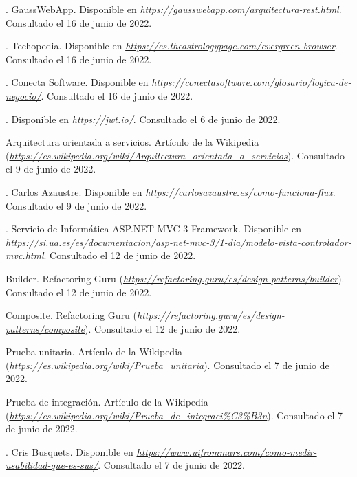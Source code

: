 \begin{thebibliography}{99}
. GaussWebApp. Disponible en {\it \url{https://gausswebapp.com/arquitectura-rest.html}}. Consultado el 16 de junio de 2022.

. Techopedia. Disponible en {\it \url{https://es.theastrologypage.com/evergreen-browser}}. Consultado el 16 de junio de 2022.

. Conecta Software. Disponible en {\it \url{https://conectasoftware.com/glosario/logica-de-negocio/}}. Consultado el 16 de junio de 2022.

. Disponible en {\it \url{https://jwt.io/}}. Consultado el 6 de junio de 2022.

 Arquitectura orientada a servicios. Artículo de la Wikipedia ({\it \url{https://es.wikipedia.org/wiki/Arquitectura_orientada_a_servicios}}). Consultado el 9 de junio de 2022.

. Carlos Azaustre. Disponible en {\it \url{https://carlosazaustre.es/como-funciona-flux}}. Consultado el 9 de junio de 2022.

. Servicio de Informática ASP.NET MVC 3 Framework. Disponible en {\it \url{https://si.ua.es/es/documentacion/asp-net-mvc-3/1-dia/modelo-vista-controlador-mvc.html}}. Consultado el 12 de junio de 2022.

 Builder. Refactoring Guru ({\it \url{https://refactoring.guru/es/design-patterns/builder}}). Consultado el 12 de junio de 2022.

 Composite. Refactoring Guru ({\it \url{https://refactoring.guru/es/design-patterns/composite}}). Consultado el 12 de junio de 2022.

 Prueba unitaria. Artículo de la Wikipedia ({\it \url{https://es.wikipedia.org/wiki/Prueba_unitaria}}). Consultado el 7 de junio de 2022.

 Prueba de integración. Artículo de la Wikipedia ({\it \url{https://es.wikipedia.org/wiki/Prueba_de_integraci%C3%B3n}}). Consultado el 7 de junio de 2022.

. Cris Busquets. Disponible en {\it \url{https://www.uifrommars.com/como-medir-usabilidad-que-es-sus/}}. Consultado el 7 de junio de 2022.


\end{thebibliography}
